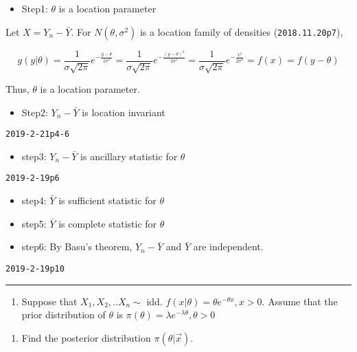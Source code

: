 \documentclass[12pt,]{article}
\providecommand{\tightlist}{%
  \setlength{\itemsep}{0pt}\setlength{\parskip}{0pt}}
\begin{document}
\begin{itemize}
\tightlist
\item
  Step1: \(\theta\) is a location parameter
\end{itemize}

Let \(X=Y_n-\bar Y\). For \(N(\theta,\sigma^2)\) is a location family of
densities (\texttt{2018.11.20p7}),

\[g(y|\theta)=\frac1{\sigma\sqrt{2\pi}}e^{-\frac{y-\theta}{2\sigma^2}}=\frac1{\sigma\sqrt{2\pi}}e^{-\frac{(y-\theta)^2}{2\sigma^2}}=\frac1{\sigma\sqrt{2\pi}}e^{-\frac{x^2}{2\sigma^2}}=f(x)=f(y-\theta)\]

Thus, \(\theta\) is a location parameter.

\begin{itemize}
\tightlist
\item
  Step2: \(Y_n-\bar Y\) is location invariant
\end{itemize}

\texttt{2019-2-21p4-6}

\begin{itemize}
\tightlist
\item
  step3: \(Y_n-\bar Y\) is ancillary statistic for \(\theta\)
\end{itemize}

\texttt{2019-2-19p6}

\begin{itemize}
\item
  step4: \(\bar Y\) is sufficient statistic for \(\theta\)
\item
  step5: \(\bar Y\) is complete statistic for \(\theta\)
\item
  step6: By Basu's theorem, \(Y_n-\bar Y\) and \(\bar Y\) are
  independent.
\end{itemize}

\texttt{2019-2-19p10}

\begin{center}\rule{0.5\linewidth}{\linethickness}\end{center}

\begin{enumerate}
\def\labelenumi{\arabic{enumi}.}
\setcounter{enumi}{2}
\tightlist
\item
  \textcolor[rgb]{0.5,0.5,0.5}{Suppose that $X_1,X_2,..X_n\sim$ idd. $f(x|\theta)=\theta e^{-\theta x}, x>0$. Assume that the prior distribution of $\theta$ is $\pi(\theta)=\lambda e^{-\lambda\theta},\theta>0$}
\end{enumerate}

\begin{enumerate}
\def\labelenumi{\alph{enumi}.}
\tightlist
\item
  \textcolor[rgb]{0.5,0.5,0.5}{Find the posterior distribution $\pi(\theta|\vec x)$.}
\end{enumerate}
\end{document}
